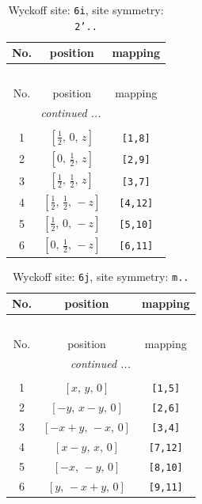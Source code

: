 \documentclass[fleqn,8pt]{jsarticle}
\begin{document}
\renewcommand{\arraystretch}{1.2}
\begin{longtable}{ccc}
\caption{Wyckoff site: {\tt 6i}, site symmetry: {\tt 2'..}}
 \\
 \hline \hline
No. & position & mapping \\ \hline \endfirsthead

\multicolumn{2}{l}{\tablename\ \thetable{}} \\
 \hline \hline
No. & position & mapping \\ \hline \endhead

 \hline \hline
\multicolumn{2}{r}{\footnotesize\it continued ...} \\ \endfoot

 \hline \hline
\multicolumn{2}{r}{} \\ \endlastfoot

1 & $\left[ \frac{1}{2},\, 0,\, z \right]$ & {\tt [1,8]} \\ \hline
2 & $\left[ 0,\, \frac{1}{2},\, z \right]$ & {\tt [2,9]} \\ \hline
3 & $\left[ \frac{1}{2},\, \frac{1}{2},\, z \right]$ & {\tt [3,7]} \\ \hline
4 & $\left[ \frac{1}{2},\, \frac{1}{2},\, - z \right]$ & {\tt [4,12]} \\ \hline
5 & $\left[ \frac{1}{2},\, 0,\, - z \right]$ & {\tt [5,10]} \\ \hline
6 & $\left[ 0,\, \frac{1}{2},\, - z \right]$ & {\tt [6,11]} \\
\end{longtable}
\renewcommand{\arraystretch}{1.2}
\begin{longtable}{ccc}
\caption{Wyckoff site: {\tt 6j}, site symmetry: {\tt m..}}
 \\
 \hline \hline
No. & position & mapping \\ \hline \endfirsthead

\multicolumn{2}{l}{\tablename\ \thetable{}} \\
 \hline \hline
No. & position & mapping \\ \hline \endhead

 \hline \hline
\multicolumn{2}{r}{\footnotesize\it continued ...} \\ \endfoot

 \hline \hline
\multicolumn{2}{r}{} \\ \endlastfoot

1 & $\left[ x,\, y,\, 0 \right]$ & {\tt [1,5]} \\ \hline
2 & $\left[ - y,\, x - y,\, 0 \right]$ & {\tt [2,6]} \\ \hline
3 & $\left[ - x + y,\, - x,\, 0 \right]$ & {\tt [3,4]} \\ \hline
4 & $\left[ x - y,\, x,\, 0 \right]$ & {\tt [7,12]} \\ \hline
5 & $\left[ - x,\, - y,\, 0 \right]$ & {\tt [8,10]} \\ \hline
6 & $\left[ y,\, - x + y,\, 0 \right]$ & {\tt [9,11]} \\
\end{longtable}
\end{document}
